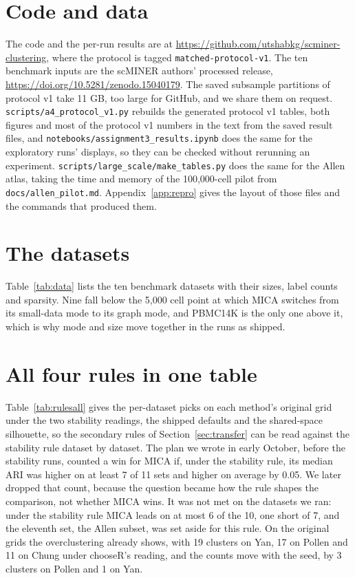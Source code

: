 \section{Code and data}\label{app:links}
The code and the per-run results are at \url{https://github.com/utshabkg/scminer-clustering}, where the
protocol is tagged \texttt{matched-protocol-v1}. The ten benchmark inputs are the scMINER authors'
processed release, \url{https://doi.org/10.5281/zenodo.15040179}. The saved subsample partitions of
protocol v1 take 11 GB, too large for GitHub, and we share them on request.
\texttt{scripts/a4\_protocol\_v1.py} rebuilds the generated protocol v1 tables, both figures and most of
the protocol v1 numbers in the text from the saved result files, and
\texttt{notebooks/assignment3\_results.ipynb} does the same for the exploratory runs' displays, so they
can be checked without rerunning an experiment. \texttt{scripts/large\_scale/make\_tables.py} does the same
for the Allen atlas, taking the time and memory of the 100,000-cell pilot from \texttt{docs/allen\_pilot.md}. Appendix~\ref{app:repro} gives the layout of those files
and the commands that produced them.

\section{The datasets}\label{app:data}
Table~\ref{tab:data} lists the ten benchmark datasets with their sizes, label counts and
sparsity. Nine fall below the 5,000 cell point at which MICA switches from its small-data
mode to its graph mode, and PBMC14K is the only one above it, which is why mode and size
move together in the runs as shipped.





\section{All four rules in one table}\label{app:rulesall}
Table~\ref{tab:rulesall} gives the per-dataset picks on each method's original grid under the two
stability readings, the shipped defaults and the shared-space silhouette, so the secondary rules of
Section~\ref{sec:transfer} can be read against the stability rule dataset by dataset. The plan we wrote in early October, before the stability runs, counted a win for MICA
if, under the stability rule, its median ARI was higher on at least 7 of 11 sets and higher on
average by 0.05. We later dropped that count, because the question became how the rule shapes the comparison, not whether MICA wins. It was not met on the datasets we ran:
under the stability rule MICA leads on at most 6 of the 10, one short of 7, and the eleventh set,
the Allen subset, was set aside for this rule. On the original grids the overclustering already
shows, with 19 clusters on Yan, 17 on Pollen and 11 on Chung under chooseR's reading, and the counts
move with the seed, by 3 clusters on Pollen and 1 on Yan.

